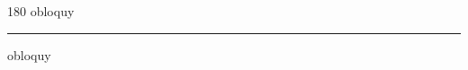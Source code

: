 
\begin{frame}
\begin{center}
\begin{turn}{180}
{\fontsize{2.5cm}{1em}\selectfont obloquy}
\end{turn}
\vspace{1em}\par  
\hrule
\vspace{1em}\par  
{\fontsize{2.5cm}{1em}\selectfont obloquy}
\end{center}
\end{frame}
